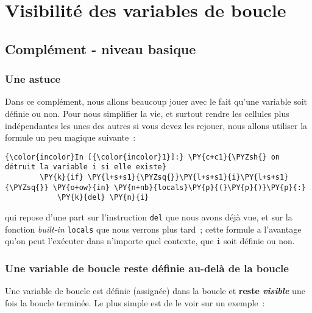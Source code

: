     \hypertarget{visibilituxe9-des-variables-de-boucle}{%
\section{Visibilité des variables de
boucle}\label{visibilituxe9-des-variables-de-boucle}}

    \hypertarget{compluxe9ment---niveau-basique}{%
\subsection{Complément - niveau
basique}\label{compluxe9ment---niveau-basique}}

    \hypertarget{une-astuce}{%
\subsubsection{Une astuce}\label{une-astuce}}

    Dans ce complément, nous allons beaucoup jouer avec le fait qu'une
variable soit définie ou non. Pour nous simplifier la vie, et surtout
rendre les cellules plus indépendantes les unes des autres si vous devez
les rejouer, nous allons utiliser la formule un peu magique suivante~:

    \begin{Verbatim}[commandchars=\\\{\}]
{\color{incolor}In [{\color{incolor}1}]:} \PY{c+c1}{\PYZsh{} on détruit la variable i si elle existe}
        \PY{k}{if} \PY{l+s+s1}{\PYZsq{}}\PY{l+s+s1}{i}\PY{l+s+s1}{\PYZsq{}} \PY{o+ow}{in} \PY{n+nb}{locals}\PY{p}{(}\PY{p}{)}\PY{p}{:} 
            \PY{k}{del} \PY{n}{i}      
\end{Verbatim}


    qui repose d'une part sur l'instruction \texttt{del} que nous avons déjà
vue, et sur la fonction \emph{built-in} \texttt{locals} que nous verrons
plus tard~; cette formule a l'avantage qu'on peut l'exécuter dans
n'importe quel contexte, que \texttt{i} soit définie ou non.

    \hypertarget{une-variable-de-boucle-reste-duxe9finie-au-deluxe0-de-la-boucle}{%
\subsubsection{Une variable de boucle reste définie au-delà de la
boucle}\label{une-variable-de-boucle-reste-duxe9finie-au-deluxe0-de-la-boucle}}

    Une variable de boucle est définie (assignée) dans la boucle et
\textbf{reste \emph{visible}} une fois la boucle terminée. Le plus
simple est de le voir sur un exemple~:

